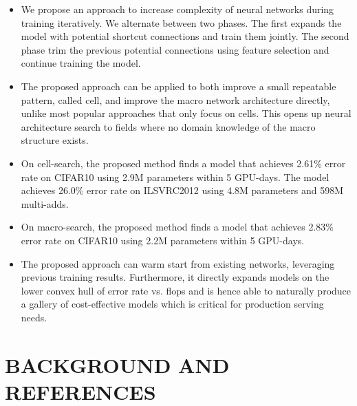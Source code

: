 \begin{itemize}
\item We propose an approach to increase complexity of neural networks during training iteratively. We alternate between two phases. The first expands the model with potential shortcut connections and train them jointly. The second phase trim the previous potential connections using feature selection and continue training the model. 
\item The proposed approach can be applied to both improve a small repeatable pattern, called cell, and improve the macro network architecture directly, unlike most popular approaches that only focus on cells. This opens up neural architecture search to fields where no domain knowledge of the macro structure exists. 
\item On cell-search, the proposed method finds a model that achieves 2.61\% error rate on CIFAR10 using 2.9M parameters within 5 GPU-days. 
The model achieves 26.0\% error rate on ILSVRC2012 using 4.8M parameters and 598M multi-adds.
\item On macro-search, the proposed method finds a model that achieves 2.83\% error rate on CIFAR10 using 2.2M parameters within 5 GPU-days. 
\item The proposed approach can warm start from existing networks, leveraging previous training results. Furthermore, it directly expands models on the lower convex hull of error rate vs. flops and is hence able to naturally produce a gallery of cost-effective models which is critical for production serving needs. 
\end{itemize}


\section{BACKGROUND AND REFERENCES}
\label{sec:nas_background}

